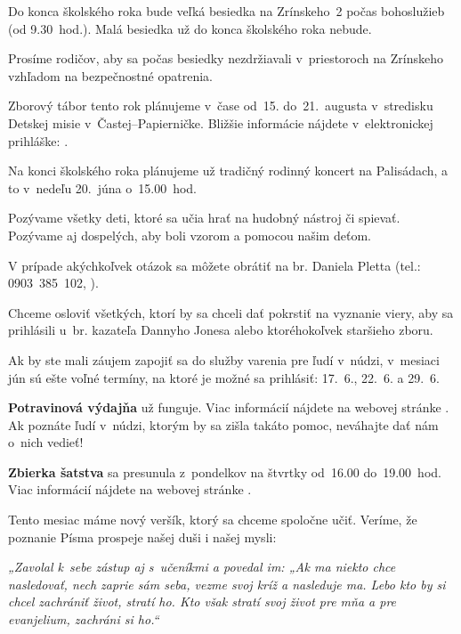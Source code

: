 

Do konca školského roka bude veľká besiedka na Zrínskeho~2 počas bohoslužieb (od 9.30~hod.). Malá besiedka už do konca školského roka nebude.

Prosíme rodičov, aby sa počas besiedky nezdržiavali v~priestoroch na Zrínskeho vzhľadom na bezpečnostné opatrenia.


Zborový tábor tento rok plánujeme v~čase od~15. do~21.~augusta v~stredisku Detskej misie v~Častej–Papierničke. Bližšie informácie nájdete v~elektronickej prihláške: .


Na konci školského roka plánujeme už tradičný rodinný koncert na Palisádach, a to v~nedeľu 20.~júna o~15.00~hod.

Pozývame všetky deti, ktoré sa učia hrať na hudobný nástroj či spievať. Pozývame aj dospelých, aby boli vzorom a pomocou našim deťom.

V prípade akýchkoľvek otázok sa môžete obrátiť na br. Daniela Pletta (tel.: 0903~385~102, ).


Chceme osloviť všetkých, ktorí by sa chceli dať pokrstiť na vyznanie viery, aby sa prihlásili u~br. kazateľa Dannyho Jonesa alebo ktoréhokoľvek staršieho zboru.


Ak by ste mali záujem zapojiť sa do služby varenia pre ľudí v~núdzi, v~mesiaci jún sú ešte voľné termíny, na ktoré je možné sa prihlásiť: 17.~6., 22.~6. a 29.~6.

{\bf Potravinová výdajňa} už funguje. Viac informácií nájdete na webovej stránke . Ak poznáte ľudí v~núdzi, ktorým by sa zišla takáto pomoc, neváhajte dať nám o~nich vedieť!

{\bf Zbierka šatstva} sa presunula z~pondelkov na štvrtky od~16.00 do~19.00~hod. Viac informácií nájdete na webovej stránke .



Tento mesiac máme nový veršík, ktorý sa chceme spoločne učiť. Veríme, že poznanie Písma prospeje našej duši i našej mysli:

{\it „Zavolal k~sebe zástup aj s~učeníkmi a povedal im: „Ak ma niekto chce nasledovať, nech zaprie sám seba, vezme svoj kríž a nasleduje ma. Lebo kto by si chcel zachrániť život, stratí ho. Kto však stratí svoj život pre mňa a pre evanjelium, zachráni si ho.“}

